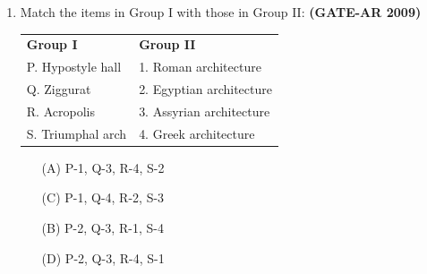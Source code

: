\documentclass[a4paper,10pt]{article}
\begin{document}
\begin{enumerate}
    \item Match the items in Group I with those in Group II: \hfill \textbf{(GATE-AR 2009)} \\
    \begin{tabular}{ p{\dimexpr\columnwidth-2\tabcolsep} p{\dimexpr\columnwidth-2\tabcolsep} }
	\textbf{Group I} & \textbf{Group II} \\
	P. Hypostyle hall & 1. Roman architecture \\
	Q. Ziggurat & 2. Egyptian architecture \\
	R. Acropolis & 3. Assyrian architecture \\
	S. Triumphal arch & 4. Greek architecture \\
	\end{tabular}
	\begin{multicols}{2}
	\begin{itemize}
        \item[(A)] P-1, Q-3, R-4, S-2
        \item[(C)] P-1, Q-4, R-2, S-3
        \item[(B)] P-2, Q-3, R-1, S-4
        \item[(D)] P-2, Q-3, R-4, S-1
    \end{itemize}
	\end{multicols}


\end{enumerate}
\end{document}
